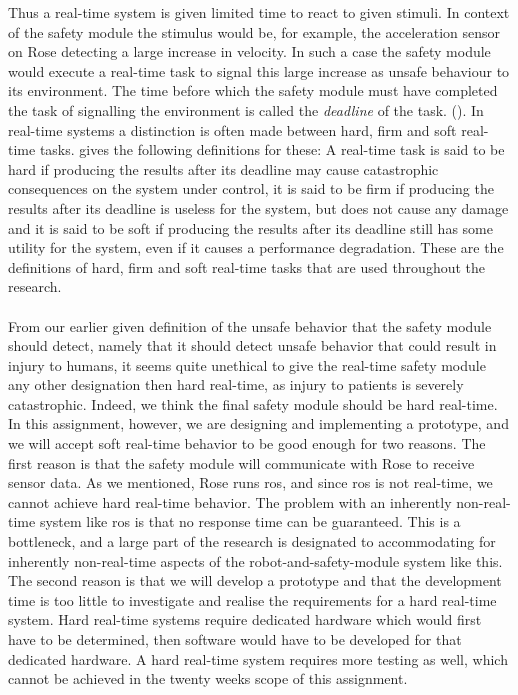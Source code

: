 \documentclass[12pt]{scrreprt}
\begin{document}
Thus a real-time system is given limited time to react to given stimuli. In context of the safety module the stimulus would be, for example, the acceleration sensor on Rose detecting a large increase in velocity. In such a case the safety module would execute a real-time task to signal this large increase as unsafe behaviour to its environment. The time before which the safety module must have completed the task of signalling the environment is called the \textit{deadline} of the task. (\cite{realtime_systems}). In real-time systems a distinction is often made between hard, firm and soft real-time tasks. \cite{buttazo} gives the following definitions for these: A real-time task is said to be hard if producing the results after its deadline
may cause catastrophic consequences on the system under control, it is said to be firm if producing the results after its deadline is useless for the system, but does not cause any damage and it is said to be soft if producing the results after its deadline still has some utility for the system, even if it causes a performance degradation. These are the definitions of hard, firm and soft real-time tasks that are used throughout the research.
\\\\
From our earlier given definition of the unsafe behavior that the safety module should detect, namely that it should detect unsafe behavior that could result in injury to humans, it seems quite unethical to give the real-time safety module any other designation then hard real-time, as injury to patients is severely catastrophic. Indeed, we think the final safety module should be hard real-time. In this assignment, however, we are designing and implementing a prototype, and we will accept soft real-time behavior to be good enough for two reasons. The first reason is that the safety module will communicate with Rose to receive sensor data. As we mentioned, Rose runs \acrlong{ros}, and since \acrlong{ros} is not real-time, we cannot achieve hard real-time behavior. The problem with an inherently non-real-time system like \acrlong{ros} is that no response time can be guaranteed. This is a bottleneck, and a large part of the research is designated to accommodating for inherently non-real-time aspects of the robot-and-safety-module system like this. The second reason is that we will develop a prototype and that the development time is too little to investigate and realise the requirements for a hard real-time system. Hard real-time systems require dedicated hardware which would first have to be determined, then software would have to be developed for that dedicated hardware. A hard real-time system requires more testing as well, which cannot be achieved in the twenty weeks scope of this assignment.
\end{document}
